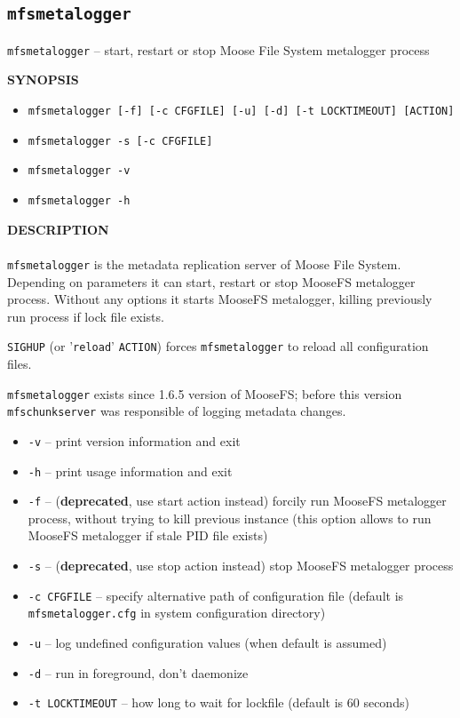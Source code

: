 \documentclass[a4paper,11pt,english]{report}
\def\code#1{\texttt{#1}}
\begin{document}
			\subsection{\code{mfsmetalogger}}
				\code{mfsmetalogger} -- start,  restart  or stop Moose File System metalogger process

				\bigskip
				\textbf{SYNOPSIS}
				\begin{itemize}
					\item \code{mfsmetalogger [-f] [-c CFGFILE] [-u] [-d] [-t LOCKTIMEOUT] [ACTION]}
					\item \code{mfsmetalogger -s [-c CFGFILE]}
					\item \code{mfsmetalogger -v}
					\item \code{mfsmetalogger -h}
				\end{itemize}
				
				\bigskip
				\textbf{DESCRIPTION} \\\\
				\code{mfsmetalogger} is the metadata replication server of Moose File  System.
					Depending  on parameters it can start, restart or stop MooseFS metalogger
					process.  Without any options it starts MooseFS metalogger, killing
					previously run process if lock file exists.

					\code{SIGHUP} (or '\code{reload}' \code{ACTION}) forces \code{mfsmetalogger} to reload all configuration files.
					
					\code{mfsmetalogger} exists since 1.6.5 version of MooseFS; before  this  version
					\code{mfschunkserver} was responsible of logging metadata changes.
					
				\begin{itemize}	
					\item \code{-v} -- print version information and exit
					\item \code{-h} -- print usage information and exit
					\item \code{-f} -- (\textbf{deprecated}, use start action instead) forcily run MooseFS
						metalogger process, without trying to kill previous  instance (this
						option allows to run MooseFS  metalogger  if  stale PID file
						exists)
					\item \code{-s} -- (\textbf{deprecated}, use stop action instead)  stop  MooseFS  metalogger process

					\item \code{-c CFGFILE} -- specify  alternative path of configuration file (default is \code{mfsmetalogger.cfg} in system configuration directory)
					\item \code{-u} -- log undefined configuration values (when default is assumed)
					\item \code{-d} -- run in foreground, don't daemonize
					\item \code{-t LOCKTIMEOUT} -- how long to wait for lockfile (default is 60 seconds)
				\end{itemize}
				\bigskip
				
\end{document}
